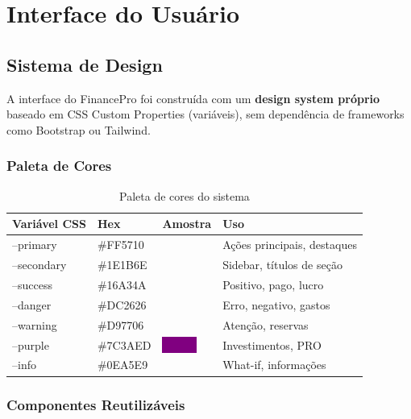\documentclass[12pt, a4paper, oneside]{report}
\begin{document}
\chapter{Interface do Usuário}

\section{Sistema de Design}

A interface do FinancePro foi construída com um \textbf{design system próprio} baseado em CSS Custom Properties (variáveis), sem dependência de frameworks como Bootstrap ou Tailwind.

\subsection{Paleta de Cores}

\begin{table}[H]
\centering
\caption{Paleta de cores do sistema}
\begin{tabularx}{\textwidth}{>{\ttfamily}l l l X}
\toprule
Variável CSS & Hex & Amostra & Uso \\
\midrule
--primary & \#FF5710 & \colorbox{primary}{\color{white}\texttt{\ \ \ \ \ \ }} & Ações principais, destaques \\
--secondary & \#1E1B6E & \colorbox{secondary}{\color{white}\texttt{\ \ \ \ \ \ }} & Sidebar, títulos de seção \\
--success & \#16A34A & \colorbox{success}{\color{white}\texttt{\ \ \ \ \ \ }} & Positivo, pago, lucro \\
--danger & \#DC2626 & \colorbox{danger}{\color{white}\texttt{\ \ \ \ \ \ }} & Erro, negativo, gastos \\
--warning & \#D97706 & \colorbox{warning}{\color{white}\texttt{\ \ \ \ \ \ }} & Atenção, reservas \\
--purple & \#7C3AED & \colorbox{purple}{\color{white}\texttt{\ \ \ \ \ \ }} & Investimentos, PRO \\
--info & \#0EA5E9 & \colorbox{info}{\color{white}\texttt{\ \ \ \ \ \ }} & What-if, informações \\
\bottomrule
\end{tabularx}
\end{table}

\subsection{Componentes Reutilizáveis}
\end{document}
